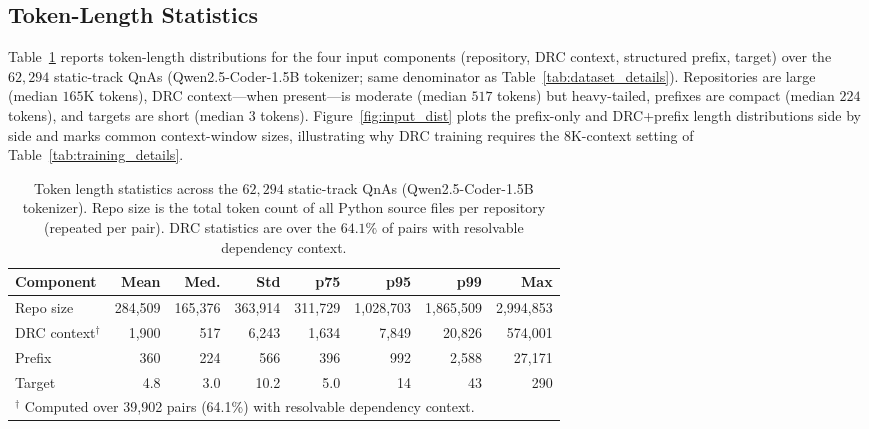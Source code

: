 \documentclass{llmxive}
\providecommand{\arraystretch}{1.1}
\begin{document}
\subsection{Token-Length Statistics}
\label{app:dataset:tokens}

Table~\ref{tab:token_stats} reports token-length distributions for the four input components (repository, DRC context, structured prefix, target) over the $62{,}294$ static-track QnAs (Qwen2.5-Coder-1.5B tokenizer; same denominator as Table~\ref{tab:dataset_details}).
Repositories are large (median $165$K tokens), DRC context---when present---is moderate (median $517$ tokens) but heavy-tailed, prefixes are compact (median $224$ tokens), and targets are short (median $3$ tokens).
Figure~\ref{fig:input_dist} plots the prefix-only and DRC+prefix length distributions side by side and marks common context-window sizes, illustrating why DRC training requires the 8K-context setting of Table~\ref{tab:training_details}.

\begin{table}[t]
\begin{small}
\begin{center}
\setlength{\tabcolsep}{6pt}
\renewcommand{\arraystretch}{1.1}
\begin{tabular}{lrrrrrrr}
\toprule
\textbf{Component} & \textbf{Mean} & \textbf{Med.} & \textbf{Std} & \textbf{p75} & \textbf{p95} & \textbf{p99} & \textbf{Max} \\
\midrule
Repo size       & 284{,}509 & 165{,}376 & 363{,}914 & 311{,}729 & 1{,}028{,}703 & 1{,}865{,}509 & 2{,}994{,}853 \\
DRC context$^\dag$ & 1{,}900 & 517 & 6{,}243 & 1{,}634 & 7{,}849 & 20{,}826 & 574{,}001 \\
Prefix          & 360 & 224 & 566 & 396 & 992 & 2{,}588 & 27{,}171 \\
Target          & 4.8 & 3.0 & 10.2 & 5.0 & 14 & 43 & 290 \\
\bottomrule
\multicolumn{8}{l}{\footnotesize $^\dag$ Computed over 39{,}902 pairs (64.1\%) with resolvable dependency context.}
\end{tabular}


\end{center}
\end{small}
\caption{Token length statistics across the $62{,}294$ static-track QnAs (Qwen2.5-Coder-1.5B tokenizer). Repo size is the total token count of all Python source files per repository (repeated per pair). DRC statistics are over the $64.1\%$ of pairs with resolvable dependency context.}
\label{tab:token_stats}
\end{table}
\end{document}
